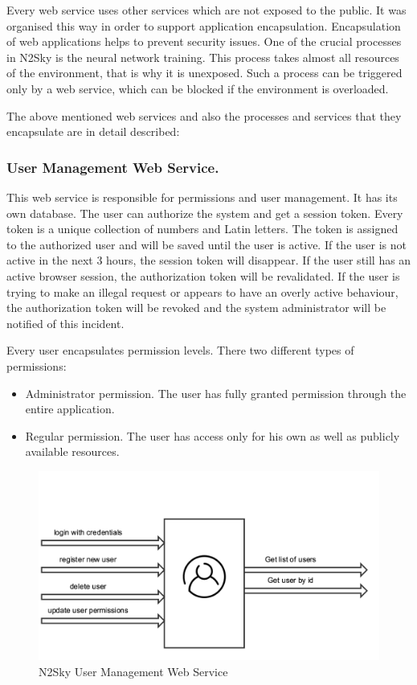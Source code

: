 Every web service uses other services which are not exposed to the public. It was organised this way in order to support application encapsulation. Encapsulation of web applications helps to prevent security issues. One of the crucial processes in N2Sky is the neural network training. This process takes almost all resources of the environment, that is why it is unexposed. Such a process can be triggered only by a web service, which can be blocked if the environment is overloaded.

The above mentioned web services and also the processes and services that they encapsulate are in detail described:  


\subsubsection{User Management Web Service.}\label{User Management Web Service}   This web service is responsible for permissions and user management. It has its own database. The user can authorize the system and get a session token. Every token is a unique collection of numbers and Latin letters. The token is assigned to the authorized user and will be saved until the user is active. If the user is not active in the next 3 hours, the session token will disappear. If the user still has an active browser session, the authorization token will be revalidated. If the user is trying to make an illegal request or appears to have an overly active behaviour, the authorization token will be revoked and the system administrator will be notified of this incident. 

Every user encapsulates permission levels. There two different types of permissions:
\begin{itemize}
\item Administrator permission. The user has fully granted permission through the entire application.
\item Regular permission. The user has access only for his own as well as publicly available resources.  
\end{itemize}

 \begin{figure}[H]
\begin{center}
  \includegraphics[width=\linewidth]{components/3/components/user_serivice.png}
  \caption{N2Sky User Management Web Service}
  \label{fig:user_serivice}
\end{center}
\end{figure}

